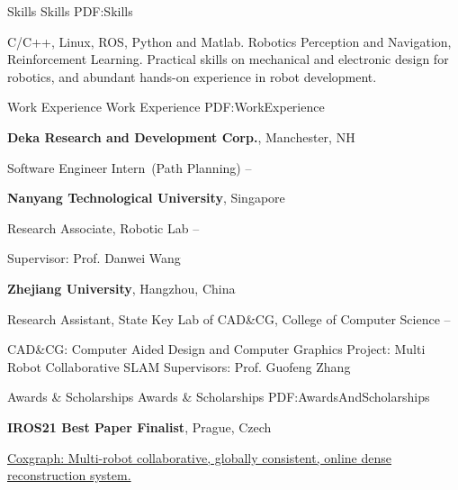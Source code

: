 \documentclass[letterpaper,MMMyyyy,nonstopmode]{simpleresumecv}
\begin{document}
\begin{Body}

\Section
{Skills}
{Skills}
{PDF:Skills}

\Entry
\BulletItem
C/C++, Linux, ROS, Python and Matlab.
\BulletItem
Robotics Perception and Navigation, Reinforcement Learning.
\BulletItem
Practical skills on mechanical and electronic design for robotics, and abundant hands-on experience in robot development.


\Section
{Work\newline
	Experience}
{Work Experience}
{PDF:WorkExperience}

\Entry
{\textbf{Deka Research and Development Corp.}},
Manchester, NH

\BulletItem
Software Engineer Intern~(Path Planning)
\hfill
{} --

\Gap
\Entry
{\textbf{Nanyang Technological University}},
Singapore



\BulletItem
Research Associate,
Robotic Lab
\hfill
{} --
\begin{Detail}
	\SubBulletItem
	Supervisor:
	Prof. Danwei Wang
\end{Detail}

\Gap
\Entry
{\textbf{Zhejiang University}},
Hangzhou, China

\BulletItem
Research Assistant,
State Key Lab of CAD\&CG,
College of Computer Science
\hfill
{} --
\begin{Detail}
	\SubBulletItem
	CAD\&CG: Computer Aided Design and Computer Graphics
	\SubBulletItem
	Project: Multi Robot Collaborative SLAM
	\SubBulletItem
	Supervisors:
	Prof. Guofeng Zhang
\end{Detail}






\Section
{Awards \&\newline
	Scholarships}
{Awards \& Scholarships}
{PDF:AwardsAndScholarships}

\Entry
\textbf{IROS21 Best Paper Finalist}, Prague, Czech

\BulletItem
\href{https://ieeexplore.ieee.org/document/9636645}{\color{blue}Coxgraph: Multi-robot collaborative, globally consistent, online dense reconstruction system.}~\cite{xiangyu2021coxgraph}



\end{Body}
\end{document}
